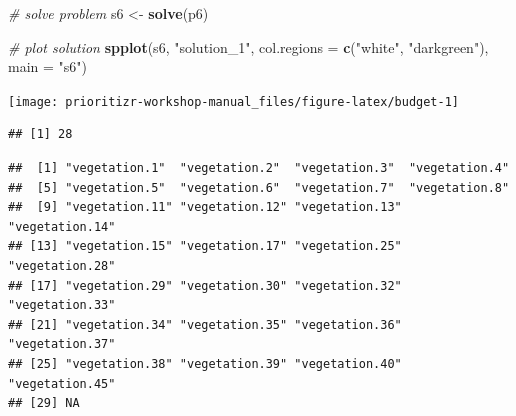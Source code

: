 \documentclass[12pt,]{book}
\newenvironment{Shaded}{\begin{snugshade}}{\end{snugshade}}
\newcommand{\KeywordTok}[1]{\textcolor[rgb]{0.13,0.29,0.53}{\textbf{#1}}}
\newcommand{\DataTypeTok}[1]{\textcolor[rgb]{0.13,0.29,0.53}{#1}}
\newcommand{\FloatTok}[1]{\textcolor[rgb]{0.00,0.00,0.81}{#1}}
\newcommand{\StringTok}[1]{\textcolor[rgb]{0.31,0.60,0.02}{#1}}
\newcommand{\CommentTok}[1]{\textcolor[rgb]{0.56,0.35,0.01}{\textit{#1}}}
\newcommand{\OtherTok}[1]{\textcolor[rgb]{0.56,0.35,0.01}{#1}}
\newcommand{\OperatorTok}[1]{\textcolor[rgb]{0.81,0.36,0.00}{\textbf{#1}}}
\newcommand{\NormalTok}[1]{#1}
\begin{document}
\begin{Shaded}
\begin{Highlighting}[]
\CommentTok{# solve problem}
\NormalTok{s6 <-}\StringTok{ }\KeywordTok{solve}\NormalTok{(p6)}

\CommentTok{# plot solution}
\KeywordTok{spplot}\NormalTok{(s6, }\StringTok{"solution_1"}\NormalTok{, }\DataTypeTok{col.regions =} \KeywordTok{c}\NormalTok{(}\StringTok{"white"}\NormalTok{, }\StringTok{"darkgreen"}\NormalTok{), }\DataTypeTok{main =} \StringTok{"s6"}\NormalTok{)}
\end{Highlighting}
\end{Shaded}

\begin{center}\texttt{[image: prioritizr-workshop-manual\_files/figure-latex/budget-1]} \end{center}

\begin{Shaded}
\end{Shaded}

\begin{verbatim}
## [1] 28
\end{verbatim}

\begin{Shaded}
\end{Shaded}

\begin{verbatim}
##  [1] "vegetation.1"  "vegetation.2"  "vegetation.3"  "vegetation.4" 
##  [5] "vegetation.5"  "vegetation.6"  "vegetation.7"  "vegetation.8" 
##  [9] "vegetation.11" "vegetation.12" "vegetation.13" "vegetation.14"
## [13] "vegetation.15" "vegetation.17" "vegetation.25" "vegetation.28"
## [17] "vegetation.29" "vegetation.30" "vegetation.32" "vegetation.33"
## [21] "vegetation.34" "vegetation.35" "vegetation.36" "vegetation.37"
## [25] "vegetation.38" "vegetation.39" "vegetation.40" "vegetation.45"
## [29] NA
\end{verbatim}
\end{document}
